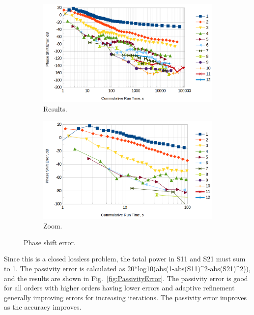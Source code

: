 \documentclass[titlepage]{article}
\renewcommand\_{\textunderscore\linebreak[1]}
\begin{document}
\begin{figure}[H]
  \centering
  \begin{subfigure}[t]{0.49\textwidth}
     \includegraphics[width=1\linewidth]{../regression/OpenParEM3D/WR90/straight_study/screenshots/PhaseShiftError}
     \caption{Results.}
  \end{subfigure}
  \begin{subfigure}[t]{0.49\textwidth}
     \includegraphics[width=1\linewidth]{../regression/OpenParEM3D/WR90/straight_study/screenshots/PhaseShiftErrorZoom}
     \caption{Zoom.}
  \end{subfigure}
  \caption{Phase shift error.}
  \label{fig:PhaseShiftError}
\end{figure}

Since this is a closed lossless problem, the total power in S11 and S21 must sum to 1.  The passivity error is calculated as 20*log10(abs(1-abs(S11)\string^2-abs(S21)\string^2)), and the results are shown in Fig.~\ref{fig:PassivityError}.  The passivity error is good for all orders with higher orders having lower errors and adaptive refinement generally improving errors for increasing iterations.  The passivity error improves as the accuracy improves.
\end{document}
